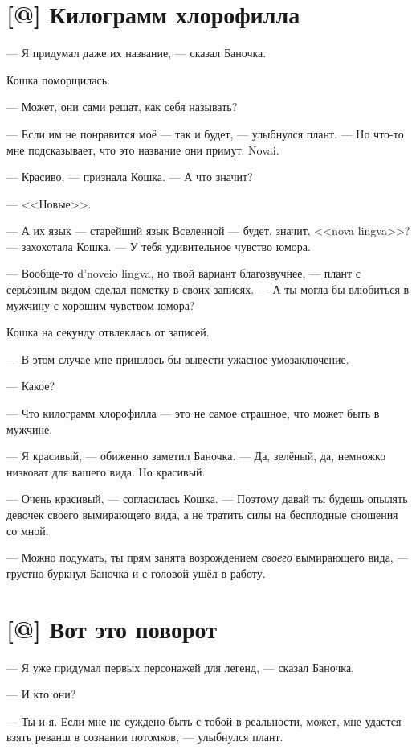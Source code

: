 \section{[@] Килограмм хлорофилла}

--- Я придумал даже их название, --- сказал Баночка.

Кошка поморщилась:

--- Может, они сами решат, как себя называть?

--- Если им не понравится моё --- так и будет, --- улыбнулся плант.
--- Но что-то мне подсказывает, что это название они примут.
Novai.

--- Красиво, --- признала Кошка.
--- А что значит?

--- <<Новые>>.

--- А их язык --- старейший язык Вселенной --- будет, значит, <<nova lingva>>? --- захохотала Кошка.
--- У тебя удивительное чувство юмора.

--- Вообще-то d'noveio lingva, но твой вариант благозвучнее, --- плант с серьёзным видом сделал пометку в своих записях.
--- А ты могла бы влюбиться в мужчину с хорошим чувством юмора?

Кошка на секунду отвлеклась от записей.

--- В этом случае мне пришлось бы вывести ужасное умозаключение.

--- Какое?

--- Что килограмм хлорофилла --- это не самое страшное, что может быть в мужчине.

--- Я красивый, --- обиженно заметил Баночка.
--- Да, зелёный, да, немножко низковат для вашего вида.
Но красивый.

--- Очень красивый, --- согласилась Кошка.
--- Поэтому давай ты будешь опылять девочек своего вымирающего вида, а не тратить силы на бесплодные сношения со мной.

--- Можно подумать, ты прям занята возрождением \emph{своего} вымирающего вида, --- грустно буркнул Баночка и с головой ушёл в работу.

\section{[@] Вот это поворот}

--- Я уже придумал первых персонажей для легенд, --- сказал Баночка.

--- И кто они?

--- Ты и я.
Если мне не суждено быть с тобой в реальности, может, мне удастся взять реванш в сознании потомков, --- улыбнулся плант.


